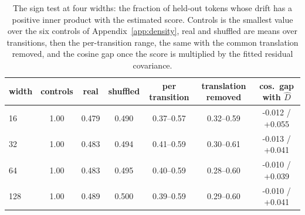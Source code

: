\begin{table}[t]
\centering
\caption{The sign test at four widths: the fraction of held-out tokens whose drift has a positive inner product with the estimated score. Controls is the smallest value over the six controls of Appendix~\ref{app:density}, real and shuffled are means over transitions, then the per-transition range, the same with the common translation removed, and the cosine gap once the score is multiplied by the fitted residual covariance.}
\label{tab:density}
\small
\setlength{\tabcolsep}{4pt}
\begin{tabular}{lcccccc}
\toprule
width & controls & real & shuffled & per transition & translation removed & cos.\ gap with $\hat D$ \\
\midrule
16 & 1.00 & 0.479 & 0.490 & 0.37--0.57 & 0.32--0.59 & -0.012 / +0.055 \\
32 & 1.00 & 0.483 & 0.494 & 0.41--0.59 & 0.30--0.61 & -0.013 / +0.041 \\
64 & 1.00 & 0.483 & 0.495 & 0.40--0.59 & 0.28--0.60 & -0.010 / +0.039 \\
128 & 1.00 & 0.489 & 0.500 & 0.39--0.59 & 0.29--0.60 & -0.010 / +0.041 \\
\bottomrule
\end{tabular}
\end{table}
